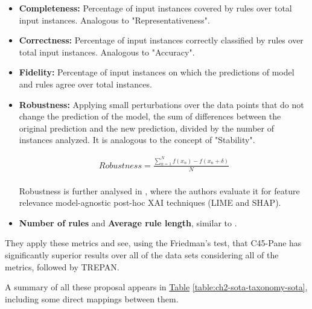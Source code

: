 \begin{itemize}
    \item \textbf{Completeness:} Percentage of input instances covered by rules over total input instances. Analogous to "Representativeness".
    \item \textbf{Correctness:} Percentage of input instances correctly classified by rules over total input instances. Analogous to "Accuracy".
    \item \textbf{Fidelity:} Percentage of input instances on which the predictions of model and rules agree over total instances.
    \item \textbf{Robustness:} Applying small perturbations over the data points that do not change the prediction of the model, the sum of differences between the original prediction and the new prediction, divided by the number of instances analyzed. It is analogous to the concept of "Stability".
    
    \begin{equation}
    \begin{split}
      Robustness = \frac{\sum_{n=1}^{N} f(x_n) - f(x_n + \delta)}{N} \\
    \end{split}
    \end{equation}
    
    Robustness is further analysed in \parencite{alvarez2018robustness}, where the authors evaluate it for feature relevance model-agnostic post-hoc XAI techniques (LIME and SHAP).
        
    \item \textbf{Number of rules} and \textbf{Average rule length}, similar to \parencite{barakat2010rule}.
\end{itemize}

They apply these metrics and see, using the Friedman's test, that C45-Pane has significantly superior results over all of the data sets considering all of the metrics, followed by TREPAN.

A summary of all these proposal appears in \hyperref[table:ch2-sota-taxonomy-sota]{Table} \ref{table:ch2-sota-taxonomy-sota}, including some direct mappings between them. 

